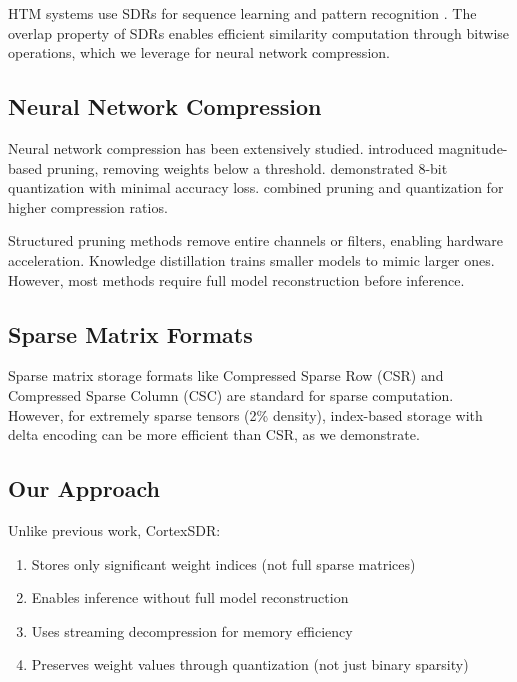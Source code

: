 \documentclass[11pt]{article}
\begin{document}
HTM systems use SDRs for sequence learning and pattern recognition \cite{hawkins2011cortical,ahmad2016properties}. The overlap property of SDRs enables efficient similarity computation through bitwise operations, which we leverage for neural network compression.

\subsection{Neural Network Compression}

Neural network compression has been extensively studied. \citet{han2015learning} introduced magnitude-based pruning, removing weights below a threshold. \citet{hubara2017quantized} demonstrated 8-bit quantization with minimal accuracy loss. \citet{polino2018model} combined pruning and quantization for higher compression ratios.

Structured pruning methods \cite{li2016pruning,wen2016learning} remove entire channels or filters, enabling hardware acceleration. Knowledge distillation \cite{hinton2015distilling} trains smaller models to mimic larger ones. However, most methods require full model reconstruction before inference.

\subsection{Sparse Matrix Formats}

Sparse matrix storage formats like Compressed Sparse Row (CSR) \cite{saad2003iterative} and Compressed Sparse Column (CSC) are standard for sparse computation. However, for extremely sparse tensors (2\% density), index-based storage with delta encoding can be more efficient than CSR, as we demonstrate.

\subsection{Our Approach}

Unlike previous work, CortexSDR:
\begin{enumerate}
    \item Stores only significant weight indices (not full sparse matrices)
    \item Enables inference without full model reconstruction
    \item Uses streaming decompression for memory efficiency
    \item Preserves weight values through quantization (not just binary sparsity)
\end{enumerate}
\end{document}
